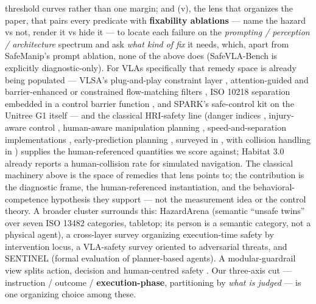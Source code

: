 threshold curves rather than one margin; and (v), the lens that organizes the paper, that pairs every predicate with \textbf{fixability ablations} --- name the hazard vs not, render it vs hide it --- to locate each failure on the \emph{prompting / perception / architecture} spectrum and ask \emph{what kind of fix} it needs, which, apart from SafeManip's prompt ablation, none of the above does (SafeVLA-Bench is explicitly diagnostic-only). For VLAs specifically that remedy space is already being populated --- VLSA's plug-and-play constraint layer \citep{ref22}, attention-guided \citep{ref41} and barrier-enhanced or constrained flow-matching filters \citep{ref42,ref43}, ISO 10218 separation embedded in a control barrier function \citep{ref44}, and SPARK's safe-control kit on the Unitree G1 itself \citep{ref40} --- and the classical HRI-safety line (danger indices \citep{ref46}, injury-aware control \citep{ref48}, human-aware manipulation planning \citep{ref49}, speed-and-separation implementations \citep{ref50}, early-prediction planning \citep{ref51}, surveyed in \citep{ref52}, with collision handling in \citep{ref47}) supplies the human-referenced quantities we score against; Habitat 3.0 \citep{ref45} already reports a human-collision rate for simulated navigation. The classical machinery above is the space of remedies that lens points to; the contribution is the diagnostic frame, the human-referenced instantiation, and the behavioral-competence hypothesis they support --- not the measurement idea or the control theory. A broader cluster surrounds this: HazardArena \citep{ref19} (semantic ``unsafe twins'' over seven ISO 13482 categories, tabletop; its person is a semantic category, not a physical agent), a cross-layer survey \citep{ref28} organizing execution-time safety by intervention locus, a VLA-safety survey \citep{ref29} oriented to adversarial threats, and SENTINEL \citep{ref31} (formal evaluation of planner-based agents). A modular-guardrail view splits action, decision and human-centred safety \citep{ref82}. Our three-axis cut --- instruction / outcome / \textbf{execution-phase}, partitioning by \emph{what is judged} --- is one organizing choice among these.

